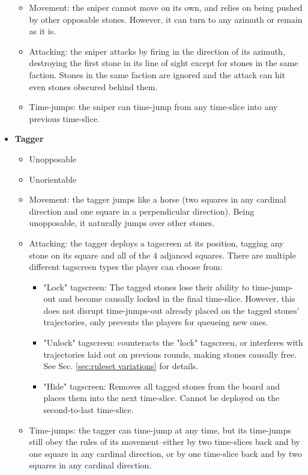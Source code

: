 \documentclass[12pt]{article}
\begin{document}
\begin{itemize}
\begin{itemize}
		\item Movement: the sniper cannot move on its own, and relies on being pushed by other opposable stones. However, it can turn to any azimuth or remain as it is.
		\item Attacking: the sniper attacks by firing in the direction of its azimuth, destroying the first stone in its line of sight except for stones in the same faction. Stones in the same faction are ignored and the attack can hit even stones obscured behind them.
		\item Time-jumps: the sniper can time-jump from any time-slice into any previous time-slice.
		\end{itemize}
	\item \textbf{Tagger}
		\begin{itemize}
		\item Unopposable
		\item Unorientable
		\item Movement: the tagger jumps like a horse (two squares in any cardinal direction and one square in a perpendicular direction). Being unopposable, it naturally jumps over other stones.
		\item Attacking: the tagger deploys a tagscreen at its position, tagging any stone on its square and all of the $4$ adjanced squares. There are multiple different tagscreen types the player can choose from:
		\begin{itemize}
			\item "Lock" tagscreen: The tagged stones lose their ability to time-jump-out and become causally locked in the final time-slice. However, this does not disrupt time-jumps-out already placed on the tagged stones' trajectories, only prevents the players for queueing new ones.
			\item "Unlock" tagscreen: counteracts the "lock" tagscreen, or interferes with trajectories laid out on previous rounds, making stones causally free. See Sec. \ref{sec:ruleset variations} for details.
			\item "Hide" tagscreen: Removes all tagged stones from the board and places them into the next time-slice. Cannot be deployed on the second-to-last time-slice.
		\end{itemize}
		\item Time-jumps: the tagger can time-jump at any time, but its time-jumps still obey the rules of its movement--either by two time-slices back and by one square in any cardinal direction, or by one time-slice back and by two squares in any cardinal direction.

\end{itemize}
\end{itemize}
\end{document}
